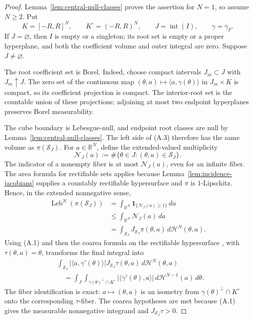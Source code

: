 \begin{proof}
Lemma~\ref{lem:central-null-classes} proves the assertion for $N=1$, so
assume $N\geq2$.  Put
\[
K=[-R,R]^N,
\qquad K^\circ=(-R,R)^N,
\qquad J=\operatorname{int}(I),
\qquad \gamma=\gamma_F.
\]
If $J=\varnothing$, then $I$ is empty or a singleton; its root set is empty
or a proper hyperplane, and both the coefficient volume and outer integral
are zero.  Suppose $J\neq\varnothing$.

The root coefficient set is Borel.  Indeed, choose compact intervals
$J_m\subset J$ with $J_m\uparrow J$.  The zero set of the continuous map
$(\theta,a)\mapsto\langle a,\gamma(\theta)\rangle$ in $J_m\times K$ is
compact, so its coefficient projection is compact.  The interior-root set is
the countable union of these projections; adjoining at most two endpoint
hyperplanes preserves Borel measurability.

The cube boundary is Lebesgue-null, and endpoint root classes are null by
Lemma~\ref{lem:central-null-classes}.  The left side of (A.3) therefore has
the same volume as $\pi(\mathcal S_J)$.  For $a\in\mathbb R^N$, define the
extended-valued multiplicity
\[
\mathcal N_J(a)
:=\#\{\theta\in J:(\theta,a)\in\mathcal S_J\}.
\]
The indicator of a nonempty fiber is at most $\mathcal N_J(a)$, even for an
infinite fiber.  The area formula for rectifiable sets
\citep{federer1969gmt} applies because
Lemma~\ref{lem:incidence-jacobians} supplies a countably rectifiable
hypersurface and $\pi$ is $1$-Lipschitz.  Hence, in the extended nonnegative
sense,
\[
\begin{aligned}
\operatorname{Leb}^N(\pi(\mathcal S_J))
&=\int_{\mathbb R^N}
  \mathbf1_{\{\mathcal N_J(a)\geq1\}}\,da\\
&\leq\int_{\mathbb R^N}\mathcal N_J(a)\,da\\
&=\int_{\mathcal S_J}
  J_{\mathcal S_J}\pi(\theta,a)\,d\mathcal H^N(\theta,a).
\end{aligned}
\tag{A.4}
\]
Using (A.1) and then the coarea formula on the rectifiable hypersurface
\citep{federer1969gmt}, with $\tau(\theta,a)=\theta$, transforms the final
integral into
\[
\begin{aligned}
&\int_{\mathcal S_J}
 |\langle a,\gamma'(\theta)\rangle|
 J_{\mathcal S_J}\tau(\theta,a)
 \,d\mathcal H^N(\theta,a)\\
&\quad=
\int_J\int_{\gamma(\theta)^\perp\cap K^\circ}
 |\langle\gamma'(\theta),a\rangle|
 \,d\mathcal H^{N-1}(a)\,d\theta.
\end{aligned}
\tag{A.5}
\]
The fiber identification is exact: $a\mapsto(\theta,a)$ is an isometry from
$\gamma(\theta)^\perp\cap K^\circ$ onto the corresponding $\tau$-fiber.
The coarea hypotheses are met because (A.1) gives the measurable
nonnegative integrand and $J_{\mathcal S_J}\tau>0$.


\end{proof}
